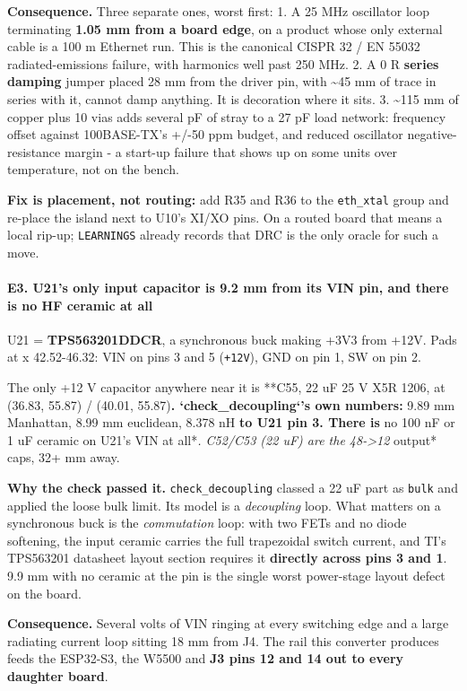 \documentclass[11pt,a4paper]{article}
\begin{document}
\textbf{Consequence.} Three separate ones, worst first: 1. A 25 MHz oscillator loop terminating \textbf{1.05 mm from a board edge}, on a product whose only external cable is a 100 m Ethernet run. This is the canonical CISPR 32 / EN 55032 radiated-emissions failure, with harmonics well past 250 MHz. 2. A 0 R \textbf{series damping} jumper placed 28 mm from the driver pin, with \textasciitilde{}45 mm of trace in series with it, cannot damp anything. It is decoration where it sits. 3. \textasciitilde{}115 mm of copper plus 10 vias adds several pF of stray to a 27 pF load network: frequency offset against 100BASE-TX's +/-50 ppm budget, and reduced oscillator negative-resistance margin - a start-up failure that shows up on some units over temperature, not on the bench.

\textbf{Fix is placement, not routing:} add R35 and R36 to the \texttt{eth\_xtal} group and re-place the island next to U10's XI/XO pins. On a routed board that means a local rip-up; \texttt{LEARNINGS} already records that DRC is the only oracle for such a move.

\paragraph*{E3. U21's only input capacitor is 9.2 mm from its VIN pin, and there is no HF ceramic at all}
U21 = \textbf{TPS563201DDCR}, a synchronous buck making +3V3 from +12V. Pads at x 42.52-46.32: VIN on pins 3 and 5 (\texttt{+12V}), GND on pin 1, SW on pin 2.

The only +12 V capacitor anywhere near it is {*}{*}C55, 22 uF 25 V X5R 1206, at (36.83, 55.87) / (40.01, 55.87)\textbf{. `check\_decoupling`'s own numbers: }9.89 mm Manhattan, 8.99 mm euclidean, 8.378 nH\textbf{ to U21 pin 3. There is }no 100 nF or 1 uF ceramic on U21's VIN at all{*}\emph{. C52/C53 (22 uF) are the 48-\textgreater{}12 }output{*} caps, 32+ mm away.

\textbf{Why the check passed it.} \texttt{check\_decoupling} classed a 22 uF part as \texttt{bulk} and applied the loose bulk limit. Its model is a \emph{decoupling} loop. What matters on a synchronous buck is the \emph{commutation} loop: with two FETs and no diode softening, the input ceramic carries the full trapezoidal switch current, and TI's TPS563201 datasheet layout section requires it \textbf{directly across pins 3 and 1}. 9.9 mm with no ceramic at the pin is the single worst power-stage layout defect on the board.

\textbf{Consequence.} Several volts of VIN ringing at every switching edge and a large radiating current loop sitting 18 mm from J4. The rail this converter produces feeds the ESP32-S3, the W5500 and \textbf{J3 pins 12 and 14 out to every daughter board}.
\end{document}
